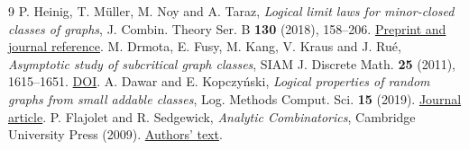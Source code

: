 \documentclass[11pt]{article}
\begin{document}
\begin{thebibliography}{9}
 P. Heinig, T. M\"uller, M. Noy and A. Taraz, \emph{Logical limit laws for minor-closed classes of graphs}, J. Combin. Theory Ser. B \textbf{130} (2018), 158--206. \href{https://arxiv.org/abs/1401.7021}{Preprint and journal reference}.
 M. Drmota, E. Fusy, M. Kang, V. Kraus and J. Ru\'e, \emph{Asymptotic study of subcritical graph classes}, SIAM J. Discrete Math. \textbf{25} (2011), 1615--1651. \href{https://doi.org/10.1137/100790161}{DOI}.
 A. Dawar and E. Kopczy\'nski, \emph{Logical properties of random graphs from small addable classes}, Log. Methods Comput. Sci. \textbf{15} (2019). \href{https://lmcs.episciences.org/5644}{Journal article}.
 P. Flajolet and R. Sedgewick, \emph{Analytic Combinatorics}, Cambridge University Press (2009). \href{https://algo.inria.fr/flajolet/Publications/book.pdf}{Authors' text}.
\end{thebibliography}
\end{document}
